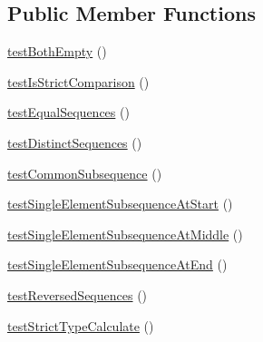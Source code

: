 \subsection*{Public Member Functions}
\begin{DoxyCompactItemize}
\item 
\mbox{\hyperlink{class_sebastian_bergmann_1_1_diff_1_1_l_c_s_1_1_longest_common_subsequence_test_a37c26fbddc637b930d40a284e0c91bbc}{test\+Both\+Empty}} ()
\item 
\mbox{\hyperlink{class_sebastian_bergmann_1_1_diff_1_1_l_c_s_1_1_longest_common_subsequence_test_a5d4bb12166eed3522539f6a79dae18cf}{test\+Is\+Strict\+Comparison}} ()
\item 
\mbox{\hyperlink{class_sebastian_bergmann_1_1_diff_1_1_l_c_s_1_1_longest_common_subsequence_test_af4cc44cd068a86351e3a5935fa839eab}{test\+Equal\+Sequences}} ()
\item 
\mbox{\hyperlink{class_sebastian_bergmann_1_1_diff_1_1_l_c_s_1_1_longest_common_subsequence_test_adc635fca23d2e2f06e948b17176b361d}{test\+Distinct\+Sequences}} ()
\item 
\mbox{\hyperlink{class_sebastian_bergmann_1_1_diff_1_1_l_c_s_1_1_longest_common_subsequence_test_a04938e6e7724ad5717263199b3d62672}{test\+Common\+Subsequence}} ()
\item 
\mbox{\hyperlink{class_sebastian_bergmann_1_1_diff_1_1_l_c_s_1_1_longest_common_subsequence_test_a0badbcdcfac62cf33d3ad1ddfcfe475b}{test\+Single\+Element\+Subsequence\+At\+Start}} ()
\item 
\mbox{\hyperlink{class_sebastian_bergmann_1_1_diff_1_1_l_c_s_1_1_longest_common_subsequence_test_a7b6d9b4d3deece99c8d210f93d647b83}{test\+Single\+Element\+Subsequence\+At\+Middle}} ()
\item 
\mbox{\hyperlink{class_sebastian_bergmann_1_1_diff_1_1_l_c_s_1_1_longest_common_subsequence_test_aacb221646ea4ce6d629c9063f35495ad}{test\+Single\+Element\+Subsequence\+At\+End}} ()
\item 
\mbox{\hyperlink{class_sebastian_bergmann_1_1_diff_1_1_l_c_s_1_1_longest_common_subsequence_test_af7d21501aa3b7d52d0be1019d5ae76fb}{test\+Reversed\+Sequences}} ()
\item 
\mbox{\hyperlink{class_sebastian_bergmann_1_1_diff_1_1_l_c_s_1_1_longest_common_subsequence_test_a65c8e5625195dc6d45666c2f358500f0}{test\+Strict\+Type\+Calculate}} ()
\end{DoxyCompactItemize}
